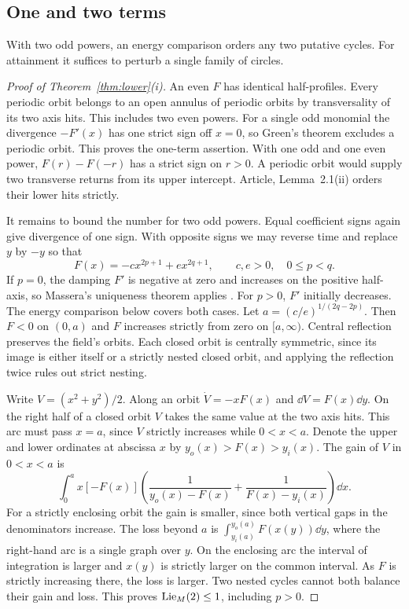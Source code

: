 \subsection{One and two terms}\label{subsec:baselines-lift}

With two odd powers, an energy comparison orders any two putative cycles.
For attainment it suffices to perturb a single family of circles.

\begin{proof}[Proof of Theorem~\ref{thm:lower}\textup{(i)}]
An even $F$ has identical half-profiles. Every periodic orbit belongs to
an open annulus of periodic orbits by transversality of its two axis hits. This includes two even powers.
For a single odd monomial the divergence $-F'(x)$ has one strict sign off
$x=0$, so Green's theorem excludes a periodic orbit. This proves the
one-term assertion. With one odd and
one even power, $F(r)-F(-r)$ has a strict sign on $r>0$. A periodic
orbit would supply two transverse returns from its upper intercept.
Article, Lemma~2.1(ii) orders their lower hits strictly.

It remains to bound the number for two odd powers. Equal coefficient signs
again give divergence of one sign. With opposite signs we may reverse
time and replace $y$ by $-y$ so that
\[
 F(x)=-c x^{2p+1}+e x^{2q+1},\qquad c,e>0,\quad 0\le p<q .
\]
If $p=0$, the damping $F'$ is negative at zero and increases on
the positive half-axis, so Massera's uniqueness theorem applies
\cite[pp.~367--369]{Massera}. For $p>0$, $F'$ initially decreases.
The energy comparison below covers both cases. Let $a=(c/e)^{1/(2q-2p)}$. Then $F<0$ on $(0,a)$ and $F$ increases
strictly from zero on $[a,\infty)$. Central reflection preserves the
field's orbits. Each closed orbit is centrally symmetric, since its image
is either itself or a strictly nested closed orbit, and applying the
reflection twice rules out strict nesting.

Write $V=(x^2+y^2)/2$. Along an orbit $\dot V=-xF(x)$ and
$\dd V=F(x)\dd y$. On the right half of a closed orbit $V$ takes the
same value at the two axis hits. This arc must pass $x=a$, since $V$
strictly increases while $0<x<a$. Denote the upper and lower ordinates
at abscissa $x$ by $y_o(x)>F(x)>y_i(x)$. The gain of $V$ in $0<x<a$ is
\[
 \int_0^a x[-F(x)]\!
 \left(\frac1{y_o(x)-F(x)}+\frac1{F(x)-y_i(x)}\right)\dd x .
\]
For a strictly enclosing orbit the gain is smaller, since both vertical
gaps in the denominators increase. The loss beyond $a$ is
$\int_{y_i(a)}^{y_o(a)} F(x(y))\dd y$, where the right-hand arc is a
single graph over $y$. On the enclosing arc the interval of integration
is larger and $x(y)$ is strictly larger on the common interval.
As $F$ is strictly increasing there, the loss is larger. Two nested
cycles cannot both balance their gain and loss. This proves
$\operatorname{Lie}_{M}(2)\le1$, including $p>0$.


\end{proof}

